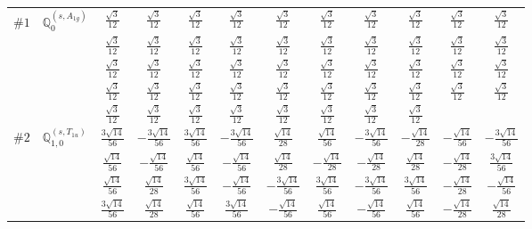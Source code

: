 \documentclass[fleqn,9pt,landscape]{jsarticle}
\begin{document}
\begin{center}
\begin{longtable}{lcccccccccc}
$ \#1\quad \mathbb{Q}_{0}^{(s,A_{1g})} $ & $ \frac{\sqrt{3}}{12} $ & $ \frac{\sqrt{3}}{12} $ & $ \frac{\sqrt{3}}{12} $ & $ \frac{\sqrt{3}}{12} $ & $ \frac{\sqrt{3}}{12} $ & $ \frac{\sqrt{3}}{12} $ & $ \frac{\sqrt{3}}{12} $ & $ \frac{\sqrt{3}}{12} $ & $ \frac{\sqrt{3}}{12} $ & $ \frac{\sqrt{3}}{12} $ \\
& $ \frac{\sqrt{3}}{12} $ & $ \frac{\sqrt{3}}{12} $ & $ \frac{\sqrt{3}}{12} $ & $ \frac{\sqrt{3}}{12} $ & $ \frac{\sqrt{3}}{12} $ & $ \frac{\sqrt{3}}{12} $ & $ \frac{\sqrt{3}}{12} $ & $ \frac{\sqrt{3}}{12} $ & $ \frac{\sqrt{3}}{12} $ & $ \frac{\sqrt{3}}{12} $ \\
& $ \frac{\sqrt{3}}{12} $ & $ \frac{\sqrt{3}}{12} $ & $ \frac{\sqrt{3}}{12} $ & $ \frac{\sqrt{3}}{12} $ & $ \frac{\sqrt{3}}{12} $ & $ \frac{\sqrt{3}}{12} $ & $ \frac{\sqrt{3}}{12} $ & $ \frac{\sqrt{3}}{12} $ & $ \frac{\sqrt{3}}{12} $ & $ \frac{\sqrt{3}}{12} $ \\
& $ \frac{\sqrt{3}}{12} $ & $ \frac{\sqrt{3}}{12} $ & $ \frac{\sqrt{3}}{12} $ & $ \frac{\sqrt{3}}{12} $ & $ \frac{\sqrt{3}}{12} $ & $ \frac{\sqrt{3}}{12} $ & $ \frac{\sqrt{3}}{12} $ & $ \frac{\sqrt{3}}{12} $ & $ \frac{\sqrt{3}}{12} $ & $ \frac{\sqrt{3}}{12} $ \\
& $ \frac{\sqrt{3}}{12} $ & $ \frac{\sqrt{3}}{12} $ & $ \frac{\sqrt{3}}{12} $ & $ \frac{\sqrt{3}}{12} $ & $ \frac{\sqrt{3}}{12} $ & $ \frac{\sqrt{3}}{12} $ & $ \frac{\sqrt{3}}{12} $ & $ \frac{\sqrt{3}}{12} $ & $  $ & $  $ \\ \hline
$ \#2\quad \mathbb{Q}_{1,0}^{(s,T_{1u})} $ & $ \frac{3 \sqrt{14}}{56} $ & $ - \frac{3 \sqrt{14}}{56} $ & $ \frac{3 \sqrt{14}}{56} $ & $ - \frac{3 \sqrt{14}}{56} $ & $ \frac{\sqrt{14}}{28} $ & $ \frac{\sqrt{14}}{56} $ & $ - \frac{3 \sqrt{14}}{56} $ & $ - \frac{\sqrt{14}}{28} $ & $ - \frac{\sqrt{14}}{56} $ & $ - \frac{3 \sqrt{14}}{56} $ \\
& $ \frac{\sqrt{14}}{56} $ & $ - \frac{\sqrt{14}}{56} $ & $ \frac{\sqrt{14}}{56} $ & $ - \frac{\sqrt{14}}{56} $ & $ \frac{\sqrt{14}}{28} $ & $ - \frac{\sqrt{14}}{28} $ & $ - \frac{\sqrt{14}}{28} $ & $ \frac{\sqrt{14}}{28} $ & $ - \frac{\sqrt{14}}{28} $ & $ \frac{3 \sqrt{14}}{56} $ \\
& $ \frac{\sqrt{14}}{56} $ & $ \frac{\sqrt{14}}{28} $ & $ \frac{3 \sqrt{14}}{56} $ & $ - \frac{\sqrt{14}}{56} $ & $ - \frac{3 \sqrt{14}}{56} $ & $ \frac{3 \sqrt{14}}{56} $ & $ - \frac{3 \sqrt{14}}{56} $ & $ \frac{3 \sqrt{14}}{56} $ & $ - \frac{\sqrt{14}}{28} $ & $ - \frac{\sqrt{14}}{56} $ \\
& $ \frac{3 \sqrt{14}}{56} $ & $ \frac{\sqrt{14}}{28} $ & $ \frac{\sqrt{14}}{56} $ & $ \frac{3 \sqrt{14}}{56} $ & $ - \frac{\sqrt{14}}{56} $ & $ \frac{\sqrt{14}}{56} $ & $ - \frac{\sqrt{14}}{56} $ & $ \frac{\sqrt{14}}{56} $ & $ - \frac{\sqrt{14}}{28} $ & $ \frac{\sqrt{14}}{28} $ \\

\end{longtable}
\end{center}
\end{document}
